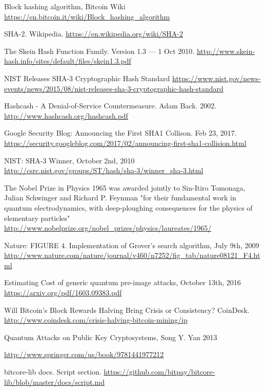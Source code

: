 \documentclass[11pt]{article}
\begin{document}
\begin{thebibliography}{7}
Block hashing algorithm, Bitcoin Wiki \url{https://en.bitcoin.it/wiki/Block_hashing_algorithm}

SHA-2. Wikipedia.
\url{https://en.wikipedia.org/wiki/SHA-2}

The Skein Hash Function Family. Version 1.3 — 1 Oct 2010.
\url{http://www.skein-hash.info/sites/default/files/skein1.3.pdf}

NIST Releases SHA-3 Cryptographic Hash Standard \url{https://www.nist.gov/news-events/news/2015/08/nist-releases-sha-3-cryptographic-hash-standard}

Hashcash - A Denial-of-Service Countermeasure. Adam Back. 2002. \url{http://www.hashcash.org/hashcash.pdf}

Google Security Blog: Announcing the First SHA1 Collison. Feb 23, 2017.
\url{https://security.googleblog.com/2017/02/announcing-first-sha1-collision.html}

NIST: SHA-3 Winner, October 2nd, 2010
\url{http://csrc.nist.gov/groups/ST/hash/sha-3/winner_sha-3.html}

The Nobel Prize in Physics 1965 was awarded jointly to Sin-Itiro Tomonaga, Julian Schwinger and Richard P. Feynman "for their fundamental work in quantum electrodynamics, with deep-ploughing consequences for the physics of elementary particles"
\url{http://www.nobelprize.org/nobel_prizes/physics/laureates/1965/}


Nature: FIGURE 4. Implementation of Grover's search algorithm, July 9th, 2009
\url{http://www.nature.com/nature/journal/v460/n7252/fig_tab/nature08121_F4.html}


Estimating Cost of generic quantum pre-image attacks, October 13th, 2016
\url{https://arxiv.org/pdf/1603.09383.pdf}

Will Bitcoin's Block Rewards Halving Bring Crisis or Consistency? CoinDesk.
\url{http://www.coindesk.com/crisis-halving-bitcoin-mining/ip}


Quantum Attacks on Public Key Cryptosystems, Song Y. Yan 2013

\url{http://www.springer.com/us/book/9781441977212}

bitcore-lib docs. Script section.
\url{https://github.com/bitpay/bitcore-lib/blob/master/docs/script.md}


\end{thebibliography}
\end{document}
